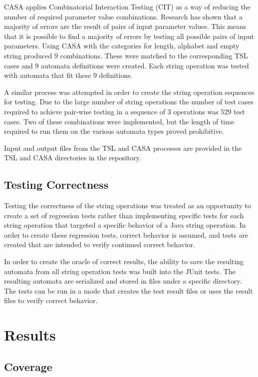 \documentclass[letterpaper,sigplan]{acmart}
\begin{document}
CASA applies Combinatorial Interaction Testing (CIT) as a way of reducing the
number of required parameter value combinations.  Research has shown that a
majority of errors are the result of pairs of input parameter values.  This
means that it is possible to find a majority of errors by testing all possible
pairs of input parameters.  Using CASA with the categories for length, alphabet
and empty string produced \(9\) combinations.  These were matched to the
corresponding TSL cases and \(9\) automata definitions were created.  Each
string operation was tested with automata that fit these 9 definitions.

A similar process was attempted in order to create the string operation
sequences for testing.  Due to the large number of string operations the number
of test cases required to achieve pair-wise testing in a sequence of \(3\)
operations was \(529\) test cases.  Two of these combinations were implemented,
but the length of time required to run them on the various automata types
proved prohibitive.

Input and output files from the TSL and CASA processes are provided in the TSL
and CASA directories in the repository.

\subsection{Testing Correctness}\label{sec:testing-correctness}

Testing the correctness of the string operations was treated as an opportunity
to create a set of regression tests rather than implementing specific tests for
each string operation that targeted a specific behavior of a Java string
operation.  In order to create these regression tests, correct behavior is
assumed, and tests are created that are intended to verify continued correct
behavior.

In order to create the oracle of correct results, the ability to save the
resulting automata from all string operation tests was built into the JUnit
tests.  The resulting automata are serialized and stored in files under a
specific directory.  The tests can be run in a mode that creates the test result
files or uses the result files to verify correct behavior.

\section{Results}\label{sec:results}

\subsection{Coverage}\label{sec:results-coverage}
\end{document}
